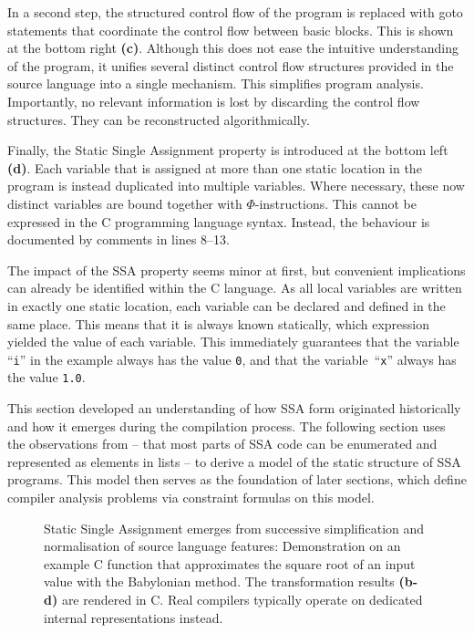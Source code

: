     In a second step, the structured control flow of the program is replaced
    with goto statements that coordinate the control flow between basic blocks.
    This is shown at the bottom right {\bf(c)}.
    Although this does not ease the intuitive understanding of the program, it
    unifies several distinct control flow structures provided in the source
    language into a single mechanism.
    This simplifies program analysis.
    Importantly, no relevant information is lost by discarding the control flow
    structures.
    They can be reconstructed algorithmically.

    Finally, the Static Single Assignment property is introduced at the bottom
    left {\bf(d)}.
    Each variable that is assigned at more than one static location in the
    program is instead duplicated into multiple variables.
    Where necessary, these now distinct variables are bound together with
    $\Phi$-instructions.
    This cannot be expressed in the C programming language syntax.
    Instead, the behaviour is documented by comments in lines 8--13.

    The impact of the SSA property seems minor at first, but convenient
    implications can already be identified within the C language.
    As all local variables are written in exactly one static location, each
    variable can be declared and defined in the same place.
    This means that it is always known statically, which expression yielded the
    value of each variable.
    This immediately guarantees that the variable ``\texttt{i}'' in the example
    always has the value \texttt{0}, and that the variable~``\texttt{x}'' always
    has the value \texttt{1.0}.

    This section developed an understanding of how SSA form originated
    historically and how it emerges during the compilation process.
    The following section uses the observations from
     -- that most parts of SSA code can be enumerated
    and represented as elements in lists -- to derive a model of the static
    structure of SSA programs.
    This model then serves as the foundation of later sections, which define
    compiler analysis problems via constraint formulas on this model.

\begin{figure}[p]
    
    \caption{Static Single Assignment emerges from successive simplification
             and normalisation of source language features: 
             Demonstration on an example C function that approximates the
             square root of an input value with the Babylonian method.
             The transformation results {\bf (b-d)} are rendered in C.
             Real compilers typically operate on
             dedicated internal representations instead.}
    \label{ssaexample}
\end{figure}

